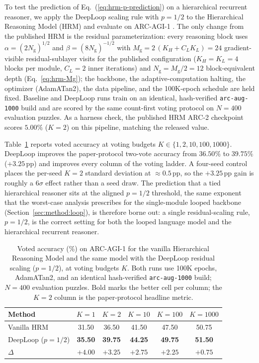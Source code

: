 \documentclass[11pt]{airesearch}
\begin{document}
To test the prediction of Eq.~(\ref{eq:hrm-p-prediction}) on a hierarchical
recurrent reasoner, we apply the DeepLoop scaling rule with $p=1/2$ to the
Hierarchical Reasoning Model (HRM) \citep{wang2025hrm} and evaluate on
ARC-AGI-1 \citep{chollet2019measure}. The only change from the published HRM is
the residual parameterization: every reasoning block uses $\alpha=(2N_{\mathrm{g}})^{1/2}$ and $\beta=(8N_{\mathrm{g}})^{-1/2}$ with $M_{\mathrm{g}}=2\,(K_H+C_LK_L)=24$ gradient-visible residual-sublayer visits for the published configuration ($K_H{=}K_L{=}4$ blocks per module, $C_L{=}2$ inner iterations) and $N_{\mathrm{g}}=M_{\mathrm{g}}/2=12$ block-equivalent depth (Eq.~\ref{eq:hrm-Mg}); the
backbone, the adaptive-computation halting, the optimizer (AdamATan2), the data
pipeline, and the 100K-epoch schedule are held fixed. Baseline and DeepLoop
runs train on an identical, hash-verified \texttt{arc-aug-1000} build and are
scored by the same count-first voting protocol on $N=400$ evaluation puzzles.
As a harness check, the published HRM ARC-2 checkpoint scores $5.00\%$
($K{=}2$) on this pipeline, matching the released value.

Table~\ref{tab:hrm-arc} reports voted accuracy at voting budgets
$K\in\{1,2,10,100,1000\}$. DeepLoop improves the paper-protocol two-vote
accuracy from $36.50\%$ to $39.75\%$ ($+3.25$\,pp) and improves every column of
the voting ladder. A four-seed control places the per-seed $K{=}2$ standard
deviation at $\approx 0.5$\,pp, so the $+3.25$\,pp gain is roughly a $6\sigma$
effect rather than a seed draw. The prediction that a tied hierarchical reasoner
sits at the aligned $p=1/2$ threshold, the same exponent that the worst-case
analysis prescribes for the single-module looped backbone
(Section~\ref{sec:method:loop}), is therefore
borne out: a single residual-scaling rule, $p=1/2$, is the correct setting for
both the looped language model and the hierarchical recurrent reasoner.

\begin{table}[ht]
  \centering
  \small
  \caption{Voted accuracy (\%) on ARC-AGI-1 for the vanilla Hierarchical
    Reasoning Model and the same model with the DeepLoop residual scaling
    ($p=1/2$), at voting budgets $K$. Both runs use 100K epochs, AdamATan2, and
    an identical hash-verified \texttt{arc-aug-1000} build; $N=400$ evaluation
    puzzles. Bold marks the better cell per column; the $K{=}2$ column is the
    paper-protocol headline metric.}
  \label{tab:hrm-arc}
  \begin{tabular}{lccccc}
    \toprule
    Method & $K{=}1$ & $K{=}2$ & $K{=}10$ & $K{=}100$ & $K{=}1000$ \\
    \midrule
    Vanilla HRM           & 31.50 & 36.50 & 41.50 & 47.50 & 50.75 \\
    DeepLoop ($p{=}1/2$)  & \textbf{35.50} & \textbf{39.75} & \textbf{44.25} & \textbf{49.75} & \textbf{51.50} \\
    $\Delta$              & $+4.00$ & $+3.25$ & $+2.75$ & $+2.25$ & $+0.75$ \\
    \bottomrule
  \end{tabular}
\end{table}
\end{document}
